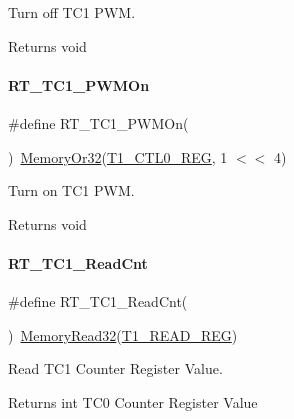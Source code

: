 Turn off T\+C1 P\+WM. 

\begin{DoxyReturn}{Returns}
void 
\end{DoxyReturn}
\mbox{\label{a00044_a66b006ccc7fcf8165e1bed013985b92e}} 
\paragraph{\texorpdfstring{R\+T\+\_\+\+T\+C1\+\_\+\+P\+W\+M\+On}{RT\_TC1\_PWMOn}}
{\footnotesize\ttfamily \#define R\+T\+\_\+\+T\+C1\+\_\+\+P\+W\+M\+On(\begin{DoxyParamCaption}{ }\end{DoxyParamCaption})~\mbox{\hyperlink{a00020_a27874a97deab7cecdde5ddecf466e31e}{Memory\+Or32}}(\mbox{\hyperlink{a00020_a55600694c3c73a1019f78d306f474fa1}{T1\+\_\+\+C\+T\+L0\+\_\+\+R\+EG}}, 1 $<$$<$ 4)}



Turn on T\+C1 P\+WM. 

\begin{DoxyReturn}{Returns}
void 
\end{DoxyReturn}
\mbox{\label{a00044_a98f0ff60ac42d9ca3eef5f7d6e893df2}} 
\paragraph{\texorpdfstring{R\+T\+\_\+\+T\+C1\+\_\+\+Read\+Cnt}{RT\_TC1\_ReadCnt}}
{\footnotesize\ttfamily \#define R\+T\+\_\+\+T\+C1\+\_\+\+Read\+Cnt(\begin{DoxyParamCaption}{ }\end{DoxyParamCaption})~\mbox{\hyperlink{a00020_a2d484dc15bdf30ee11ab3b05f31f0e16}{Memory\+Read32}}(\mbox{\hyperlink{a00020_ac4d488d7f758fa9852def3acfef02dbe}{T1\+\_\+\+R\+E\+A\+D\+\_\+\+R\+EG}})}



Read T\+C1 Counter Register Value. 

\begin{DoxyReturn}{Returns}
int T\+C0 Counter Register Value 
\end{DoxyReturn}
\mbox{\label{a00044_ac04f2d9427689062596382399aa7d909}} 

